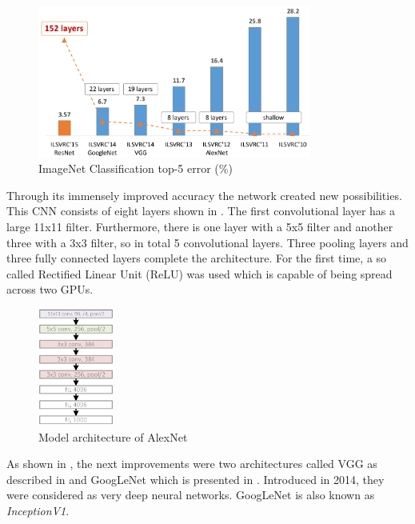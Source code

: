 \begin{figure}[htbp]
\centering
\includegraphics[width=0.8\textwidth]{includes/ImageNEtTop5Error}
\caption[ImageNet Classification top-5 error]{ImageNet Classification top-5 error (\%) \citep[p. 6]{He2016}}
\label{fig:ImageNEtTop5Error}
\end{figure}

Through its immensely improved accuracy the network created new possibilities. This CNN consists of eight layers shown in . The first convolutional layer has a large 11x11 filter. Furthermore, there is one layer with a 5x5 filter and another three with a 3x3 filter, so in total 5 convolutional layers. Three pooling layers and three fully connected layers complete the architecture. For the first time, a so called Rectified Linear Unit (ReLU) was used which is capable of being spread across two GPUs. \\

\begin{figure}[htbp]
\centering
\includegraphics[width=2.5cm]{includes/AlexNet}
\caption[Model architecture of AlexNet]{Model architecture of AlexNet \citep[p. 7]{He2016}}
\label{fig:AlexNet}
\end{figure}

As shown in , the next improvements were two architectures called VGG as described in \citet{Simonyan2015} and GoogLeNet which is presented in \citet{Szegedy2014}. Introduced in 2014, they were considered as very deep neural networks. GoogLeNet is also known as \textit{InceptionV1}. \\

